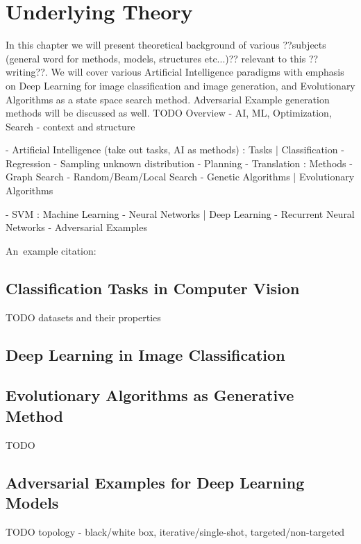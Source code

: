 \chapter{Underlying Theory}
In this chapter we will present theoretical background of various ??subjects (general word for methods, models, structures etc...)?? relevant to this ??writing??. We will cover various Artificial Intelligence paradigms with emphasis on Deep Learning for image classification and image generation, and Evolutionary Algorithms as a state space search method. Adversarial Example generation methods will be discussed as well.
TODO Overview - AI, ML, Optimization, Search - context and structure

- Artificial Intelligence (take out tasks, AI as methods)
	: Tasks
		| Classification
		- Regression
		- Sampling unknown distribution
		- Planning
		- Translation
	: Methods
		- Graph Search
		- Random/Beam/Local Search
		- Genetic Algorithms
			| Evolutionary Algorithms

		- SVM
		: Machine Learning
			- Neural Networks
			| Deep Learning
			- Recurrent Neural Networks
- Adversarial Examples

An~example citation: \cite{Andel07}

\section{Classification Tasks in Computer Vision}
TODO datasets and their properties

\section{Deep Learning in Image Classification}

\section{Evolutionary Algorithms as Generative Method}
TODO 

\section{Adversarial Examples for Deep Learning Models}
TODO topology - black/white box, iterative/single-shot, targeted/non-targeted
